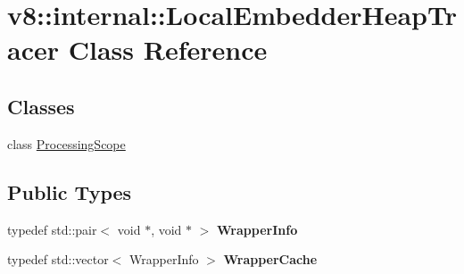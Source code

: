 \hypertarget{classv8_1_1internal_1_1LocalEmbedderHeapTracer}{}\section{v8\+:\+:internal\+:\+:Local\+Embedder\+Heap\+Tracer Class Reference}
\label{classv8_1_1internal_1_1LocalEmbedderHeapTracer}
\subsection*{Classes}
\begin{DoxyCompactItemize}
\item 
class \mbox{\hyperlink{classv8_1_1internal_1_1LocalEmbedderHeapTracer_1_1ProcessingScope}{Processing\+Scope}}
\end{DoxyCompactItemize}
\subsection*{Public Types}
\begin{DoxyCompactItemize}
\item 
\mbox{\label{classv8_1_1internal_1_1LocalEmbedderHeapTracer_a78771d7b0df8540da1f95c6c04e5b0ba}} 
typedef std\+::pair$<$ void $\ast$, void $\ast$ $>$ {\bfseries Wrapper\+Info}
\item 
\mbox{\label{classv8_1_1internal_1_1LocalEmbedderHeapTracer_a532d126f47d197195d047e062ff8426d}} 
typedef std\+::vector$<$ Wrapper\+Info $>$ {\bfseries Wrapper\+Cache}
\end{DoxyCompactItemize}
